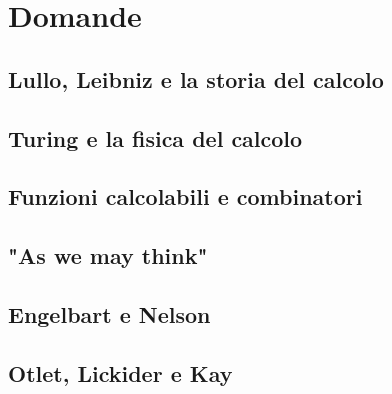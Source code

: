 \chapter{Domande}

\section{Lullo, Leibniz e la storia del calcolo}

\section{Turing e la fisica del calcolo}

\section{Funzioni calcolabili e combinatori}

\section{"As we may think"}

\section{Engelbart e Nelson}

\section{Otlet, Lickider e Kay}